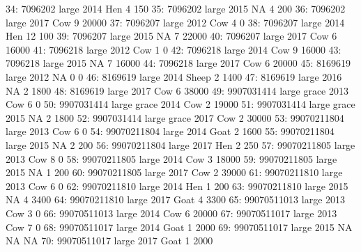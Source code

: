 \begin{Schunk}
\begin{Soutput}
34:     7096202       large 2014            Hen            4        150
35:     7096202       large 2015             NA            4        200
36:     7096202       large 2017            Cow            9      20000
37:     7096207       large 2012            Cow            4          0
38:     7096207       large 2014            Hen           12        100
39:     7096207       large 2015             NA            7      22000
40:     7096207       large 2017            Cow            6      16000
41:     7096218       large 2012            Cow            1          0
42:     7096218       large 2014            Cow            9      16000
43:     7096218       large 2015             NA            7      16000
44:     7096218       large 2017            Cow            6      20000
45:     8169619       large 2012             NA            0          0
46:     8169619       large 2014          Sheep            2       1400
47:     8169619       large 2016             NA            2       1800
48:     8169619       large 2017            Cow            6      38000
49:  9907031414 large grace 2013            Cow            6          0
50:  9907031414 large grace 2014            Cow            2      19000
51:  9907031414 large grace 2015             NA            2       1800
52:  9907031414 large grace 2017            Cow            2      30000
53: 99070211804       large 2013            Cow            6          0
54: 99070211804       large 2014           Goat            2       1600
55: 99070211804       large 2015             NA            2        200
56: 99070211804       large 2017            Hen            2        250
57: 99070211805       large 2013            Cow            8          0
58: 99070211805       large 2014            Cow            3      18000
59: 99070211805       large 2015             NA            1        200
60: 99070211805       large 2017            Cow            2      39000
61: 99070211810       large 2013            Cow            6          0
62: 99070211810       large 2014            Hen            1        200
63: 99070211810       large 2015             NA            4       3400
64: 99070211810       large 2017           Goat            4       3300
65: 99070511013       large 2013            Cow            3          0
66: 99070511013       large 2014            Cow            6      20000
67: 99070511017       large 2013            Cow            7          0
68: 99070511017       large 2014           Goat            1       2000
69: 99070511017       large 2015             NA           NA         NA
70: 99070511017       large 2017           Goat            1       2000

\end{Soutput}
\end{Schunk}
